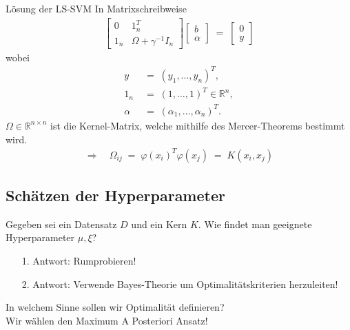\documentclass{beamer}
\begin{document}
{\begin{frame}{Lösung der LS-SVM}
	In Matrixschreibweise
	\begin{align}
		\begin{bmatrix}
			0& 1_n^T \\[0,5cm]
			1_n& \Omega+\gamma^{-1}I_n
		\end{bmatrix}
		\begin{bmatrix}
			b \\[0,2cm]
			\alpha
		\end{bmatrix}\;=\;
		\begin{bmatrix}
			0 \\[0,2cm] 
			y
		\end{bmatrix} 
	\end{align}
	wobei
	\begin{align}
		y &\;=\;(y_1,\dots,y_n)^T,\\
		1_n &\;=\;(1,\dots,1)^T\in\mathbb{R}^n,\\
		\alpha &\;=\;(\alpha_1,\dots,\alpha_n)^T.
	\end{align}
	$\Omega\in\mathbb{R}^{n\times n}$ ist die Kernel-Matrix, welche mithilfe des Mercer-Theorems bestimmt wird.
	\begin{align}
		\Rightarrow\quad\Omega_{ij} \;=\;\varphi(x_i)^T\varphi(x_j)\;=\;K(x_i,x_j)
	\end{align}
\end{frame}



\subsection{Schätzen der Hyperparameter}

\begin{frame}
	Gegeben sei ein Datensatz $D$ und ein Kern $K$. Wie findet man geeignete Hyperparameter $\mu, \xi$?
	\begin{itemize}
		\item[1.]Antwort: \pause Rumprobieren!
		\item[2.]Antwort: \pause Verwende Bayes-Theorie um Optimalitätskriterien herzuleiten!
	\end{itemize}
	In welchem Sinne sollen wir Optimalität definieren?\\ \pause
	Wir wählen den Maximum A Posteriori Ansatz!
\end{frame}


\begin{frame}


\end{frame}}
\end{document}
